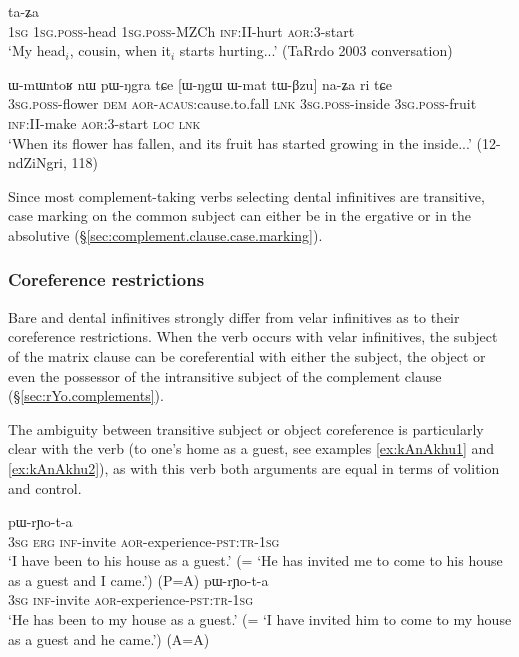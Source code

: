 \begin{exe} 
\ex \label{ex:tWmNAm.taZa}
 ta-ʑa \\
\textsc{1sg} \textsc{1sg}.\textsc{poss}-head \textsc{1sg}.\textsc{poss}-MZCh \textsc{inf}:II-hurt \textsc{aor}:3\flobv{}-start \\
\glt `My head$_i$, cousin, when it$_i$ starts hurting...' (TaRrdo 2003 conversation)
  \end{exe} 
  
\begin{exe} 
\ex \label{ex:Wmat.tWBzu.naZa}
\gll ɯ-mɯntoʁ nɯ pɯ-ŋgra tɕe [ɯ-ŋgɯ ɯ-mat tɯ-βzu] na-ʑa ri tɕe \\
\textsc{3sg}.\textsc{poss}-flower \textsc{dem} \textsc{aor}-\textsc{acaus}:cause.to.fall \textsc{lnk} \textsc{3sg}.\textsc{poss}-inside \textsc{3sg}.\textsc{poss}-fruit \textsc{inf}:II-make \textsc{aor}:3\flobv{}-start \textsc{loc} \textsc{lnk} \\
\glt `When its flower has fallen, and its fruit has started growing in the inside...' (12-ndZiNgri, 118)
 \end{exe} 
 
Since most complement-taking verbs selecting dental infinitives are transitive, case marking on the common subject can either be in the ergative or in the absolutive (§\ref{sec:complement.clause.case.marking}).

\subsubsection{Coreference restrictions} \label{sec:bare.inf.coreference}
Bare and dental infinitives strongly differ from velar infinitives as to their coreference restrictions. When the verb  occurs with velar infinitives, the subject of the matrix clause can be coreferential with either the subject, the object or even the possessor of the intransitive subject of the complement clause (§\ref{sec:rYo.complements}).

The ambiguity between transitive subject or object coreference is particularly clear with the verb  (to one's home as a guest, see examples \ref{ex:kAnAkhu1} and \ref{ex:kAnAkhu2}), as with this verb both arguments are equal in terms of volition and control.

\begin{exe}
\ex  \label{ex:kAnAkhu1}
 pɯ-rɲo-t-a  \\
\textsc{3sg} \textsc{erg} \textsc{inf}-invite \textsc{aor}-experience-\textsc{pst}:\textsc{tr}-\textsc{1sg} \\
\glt `I have been to his house as a guest.'  (= `He has invited me to come to his house as a guest and I came.') (P=A)
\ex  \label{ex:kAnAkhu2}
 pɯ-rɲo-t-a  \\
\textsc{3sg}  \textsc{inf}-invite \textsc{aor}-experience-\textsc{pst}:\textsc{tr}-\textsc{1sg} \\
\glt `He has been to my house as a guest.' (= `I have invited him to come to my house as a guest and he came.') (A=A)
\end{exe}

